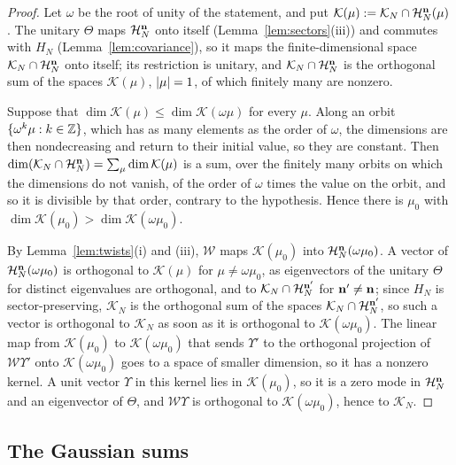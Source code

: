 \begin{proof}
Let $\omega$ be the root of unity of the statement, and put $\mathcal K(\mu):=\mathcal K_N\cap\mathcal{H}_N^{\mathbf{n}}(\mu)$. The unitary $\Theta$
maps $\mathcal{H}_N^{\mathbf{n}}$ onto itself (Lemma~\ref{lem:sectors}(iii)) and commutes with $H_N$ (Lemma~\ref{lem:covariance}), so it maps
the finite-dimensional space $\mathcal K_N\cap\mathcal{H}_N^{\mathbf{n}}$ onto itself; its restriction is unitary, and
$\mathcal K_N\cap\mathcal{H}_N^{\mathbf{n}}$ is the orthogonal sum of the spaces $\mathcal K(\mu)$, $\lvert\mu\rvert=1$, of which finitely many are
nonzero.

Suppose that $\dim\mathcal K(\mu)\le\dim\mathcal K(\omega\mu)$ for every $\mu$. Along an orbit $\{\omega^k\mu:k\in\mathbb{Z}\}$, which has
as many elements as the order of $\omega$, the dimensions are then nondecreasing and return to their initial value, so they
are constant. Then $\dim(\mathcal K_N\cap\mathcal{H}_N^{\mathbf{n}})=\sum_\mu\dim\mathcal K(\mu)$ is a sum, over the finitely many orbits on which
the dimensions do not vanish, of the order of $\omega$ times the value on the orbit, and so it is divisible by that order,
contrary to the hypothesis. Hence
there is $\mu_0$ with $\dim\mathcal K(\mu_0)>\dim\mathcal K(\omega\mu_0)$.

By Lemma~\ref{lem:twists}(i) and (iii), $\mathcal W$ maps $\mathcal K(\mu_0)$ into $\mathcal{H}_N^{\mathbf{n}}(\omega\mu_0)$. A vector of
$\mathcal{H}_N^{\mathbf{n}}(\omega\mu_0)$ is orthogonal to $\mathcal K(\mu)$ for $\mu\ne\omega\mu_0$, as eigenvectors of the unitary $\Theta$ for
distinct eigenvalues are orthogonal, and to $\mathcal K_N\cap\mathcal{H}_N^{\mathbf{n}'}$ for $\mathbf{n}'\ne\mathbf{n}$; since $H_N$ is sector-preserving,
$\mathcal K_N$ is the orthogonal sum of the spaces $\mathcal K_N\cap\mathcal{H}_N^{\mathbf{n}'}$, so such a vector is orthogonal to
$\mathcal K_N$ as soon as it is orthogonal to $\mathcal K(\omega\mu_0)$. The linear map from $\mathcal K(\mu_0)$ to
$\mathcal K(\omega\mu_0)$ that sends $\Upsilon'$ to the orthogonal projection of $\mathcal W\Upsilon'$ onto $\mathcal K(\omega\mu_0)$ goes
to a space of smaller dimension, so it has a nonzero kernel. A unit vector $\Upsilon$ in this kernel lies in
$\mathcal K(\mu_0)$, so it is a zero mode in $\mathcal{H}_N^{\mathbf{n}}$ and an eigenvector of $\Theta$, and $\mathcal W\Upsilon$ is orthogonal to
$\mathcal K(\omega\mu_0)$, hence to $\mathcal K_N$.
\end{proof}

\subsection{The Gaussian sums}

